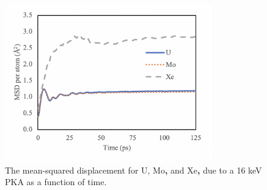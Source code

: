 \documentclass[review]{elsarticle}
\providecommand{\DIFaddtex}[1]{{\bf #1}} %
\providecommand{\DIFaddFL}[1]{\DIFadd{#1}} %
\providecommand{\DIFaddbeginFL}{} %
\providecommand{\DIFaddendFL}{} %
\providecommand{\DIFadd}[1]{\texorpdfstring{\DIFaddtex{#1}}{#1}} %
\newcommand{\DIFaddincludegraphics}[2][]{{\color{blue}\fbox{\DIFOincludegraphics[#1]{#2}}}} %
\DeclareRobustCommand{\DIFaddbeginFL}{\DIFOaddbeginFL \let\includegraphics\DIFaddincludegraphics} %
\DeclareRobustCommand{\DIFaddendFL}{\DIFOaddendFL \let\includegraphics\DIFOincludegraphics} %
\begin{document}
\begin{figure}[h]
 \centering
 \includegraphics[width=0.8\textwidth]{1_msd_vs_time.png} 
 \caption{ The mean-squared displacement for U, Mo\DIFaddbeginFL \DIFaddFL{, }\DIFaddendFL and Xe\DIFaddbeginFL \DIFaddFL{, }\DIFaddendFL due to a 16 keV PKA as a function of time.}
 \label{fig:msd}
\end{figure}
\end{document}
